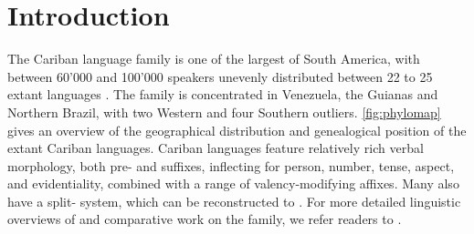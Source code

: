 \section{Introduction}
\label{sec:intro}
The Cariban language family is one of the largest of South America, with between 60'000 and 100'000 speakers unevenly distributed between 22 to 25 extant languages \parencite[441]{gildea2012classification}.
The family is concentrated in Venezuela, the Guianas and Northern Brazil, with two Western and four Southern outliers.
\cref{fig:phylomap} gives an overview of the geographical distribution and genealogical position of the extant Cariban languages.
Cariban languages feature relatively rich verbal morphology, both pre- and suffixes, inflecting for person, number, tense, aspect, and evidentiality, combined with a range of valency-modifying affixes.
Many also have a split- system, which can be reconstructed to \PC {}.
For more detailed linguistic overviews of and comparative work on the family, we refer readers to \textcites{gildea1998}{derbyshire1999carib}{meira2002first}{meira2005southern}{meira2006cariban}{gildea2007greenberg}{meira2010origin}{gildea2010story}{gildea2012classification}{matter2021cariban}{gildea2019overview}.






